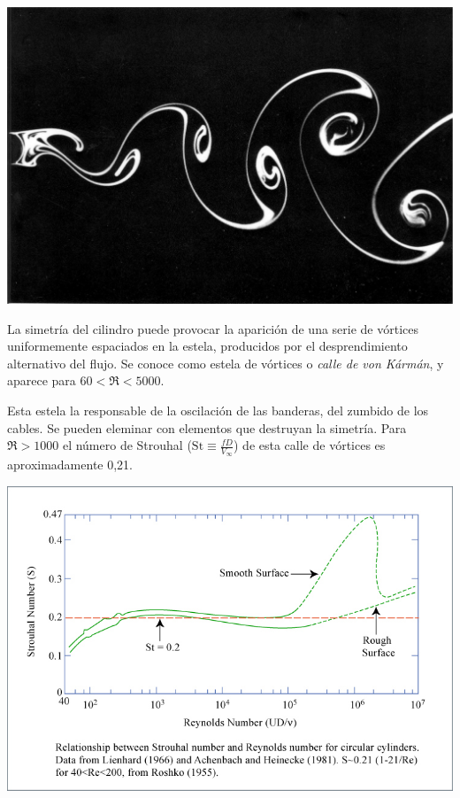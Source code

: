 	\begin{minipage}[c]{0.4\textwidth}%
\begin{center}
	\includegraphics[width=\linewidth]{TeX_files/chapter09-Externo/von_karman}
\end{center}
	\end{minipage} %
	\begin{minipage}[c]{0.58\textwidth}%
		La simetría del cilindro puede provocar la aparición de una serie
		de vórtices uniformemente espaciados en la estela, producidos por
		el desprendimiento alternativo del flujo. Se conoce como estela de
		vórtices o \textit{calle de von Kármán}, y aparece para $60<\Re<5000$. %
	\end{minipage}

	
	Esta estela la responsable de la oscilación de las banderas, del zumbido
	de los cables. Se pueden eleminar con elementos que destruyan la simetría.
	Para $\Re>1000$ el número de Strouhal ($\textrm{St}\equiv\frac{fD}{V_{\infty}}$)
	de esta calle de vórtices es aproximadamente 0,21. 
	
	\begin{center}
		\includegraphics[width=\linewidth]{TeX_files/chapter09-Externo/strouhal-reynolds}
	\end{center}
	
